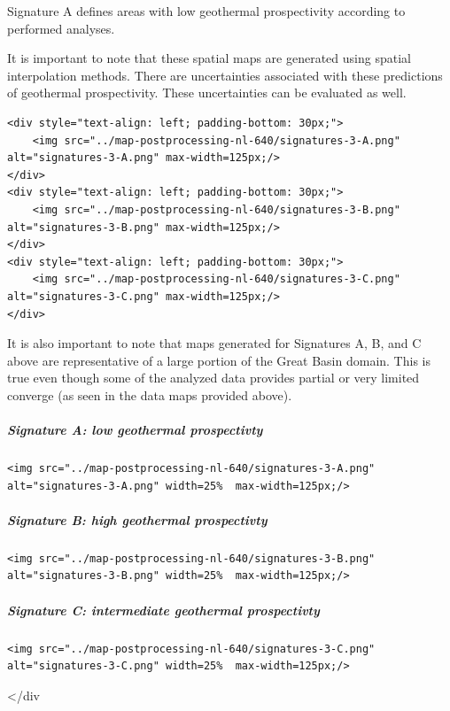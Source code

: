 \documentclass[11pt]{article}
\begin{document}
Signature A defines areas with low geothermal prospectivity according to
performed analyses.

It is important to note that these spatial maps are generated using
spatial interpolation methods. There are uncertainties associated with
these predictions of geothermal prospectivity. These uncertainties can
be evaluated as well.

\begin{verbatim}
<div style="text-align: left; padding-bottom: 30px;">
    <img src="../map-postprocessing-nl-640/signatures-3-A.png" alt="signatures-3-A.png" max-width=125px;/>
</div>
<div style="text-align: left; padding-bottom: 30px;">
    <img src="../map-postprocessing-nl-640/signatures-3-B.png" alt="signatures-3-B.png" max-width=125px;/>
</div>    
<div style="text-align: left; padding-bottom: 30px;">
    <img src="../map-postprocessing-nl-640/signatures-3-C.png" alt="signatures-3-C.png" max-width=125px;/>
</div>
\end{verbatim}

It is also important to note that maps generated for Signatures A, B,
and C above are representative of a large portion of the Great Basin
domain. This is true even though some of the analyzed data provides
partial or very limited converge (as seen in the data maps provided
above).

\hypertarget{signature-a-low-geothermal-prospectivty}{%
\subparagraph{Signature A: low geothermal
prospectivty}\label{signature-a-low-geothermal-prospectivty}}

\begin{verbatim}
<img src="../map-postprocessing-nl-640/signatures-3-A.png" alt="signatures-3-A.png" width=25%  max-width=125px;/>
\end{verbatim}

\hypertarget{signature-b-high-geothermal-prospectivty}{%
\subparagraph{Signature B: high geothermal
prospectivty}\label{signature-b-high-geothermal-prospectivty}}

\begin{verbatim}
<img src="../map-postprocessing-nl-640/signatures-3-B.png" alt="signatures-3-B.png" width=25%  max-width=125px;/>
\end{verbatim}

\hypertarget{signature-c-intermediate-geothermal-prospectivty}{%
\subparagraph{Signature C: intermediate geothermal
prospectivty}\label{signature-c-intermediate-geothermal-prospectivty}}

\begin{verbatim}
<img src="../map-postprocessing-nl-640/signatures-3-C.png" alt="signatures-3-C.png" width=25%  max-width=125px;/>
\end{verbatim}

\textless/div


    
    
    
\end{document}
